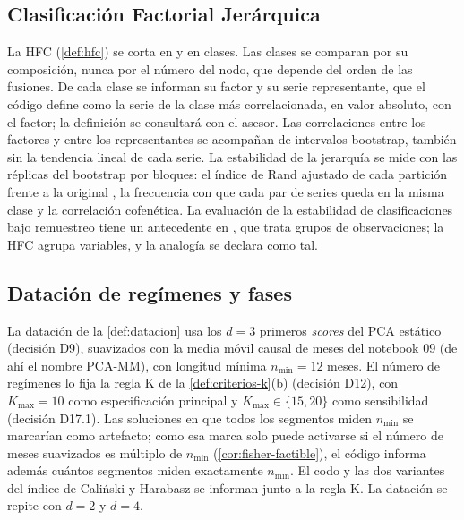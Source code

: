 \subsection{Clasificación Factorial Jerárquica}
\label{sec:met-hfc}

La HFC (\cref{def:hfc}) se corta en \clasesHfcMenor{} y en \clasesHfcMayor{} clases. Las clases se comparan por su composición,
nunca por el número del nodo, que depende del orden de las fusiones. De cada clase se informan su
factor y su serie representante, que el código define como la serie de la clase más
correlacionada, en valor absoluto, con el factor; la definición se consultará con el asesor. Las
correlaciones entre los factores y entre los representantes se acompañan de intervalos bootstrap,
también sin la tendencia lineal de cada serie. La estabilidad de la jerarquía se mide con las
réplicas del bootstrap por bloques: el índice de Rand ajustado de cada partición frente a la
original \parencite{hubert_arabie_1985}, la frecuencia
con que cada par de series queda en la misma clase y la correlación cofenética. La evaluación de
la estabilidad de clasificaciones bajo remuestreo tiene un antecedente en
\textcite{hennig_2007}, que trata
grupos de observaciones; la HFC agrupa variables, y la analogía se declara como tal.

\subsection{Datación de regímenes y fases}
\label{sec:met-datacion}

La datación de la \cref{def:datacion} usa los $d=3$ primeros \emph{scores} del PCA estático
(decisión D9), suavizados con la media móvil causal de \ventanaMediaMovil{} meses del notebook 09 (de ahí el nombre
PCA-MM\ventanaMediaMovil), con longitud mínima $n_{\min}=12$ meses. El número de regímenes lo fija la regla K de la
\cref{def:criterios-k}(b) (decisión D12), con $K_{\max}=10$ como especificación principal y
$K_{\max}\in\{15, 20\}$ como sensibilidad (decisión D17.1). Las soluciones en que todos los
segmentos miden $n_{\min}$ se marcarían como artefacto; como esa marca solo puede activarse si el
número de meses suavizados es múltiplo de $n_{\min}$ (\cref{cor:fisher-factible}), el código
informa además cuántos segmentos miden exactamente $n_{\min}$. El codo y las dos variantes del
índice de Caliński y Harabasz se informan junto a la regla K. La datación se repite con $d=2$ y
$d=4$.

